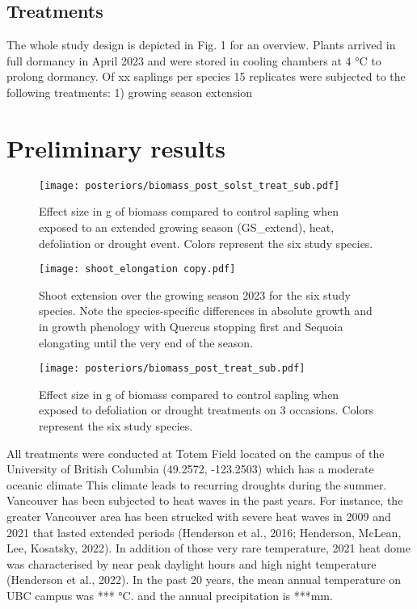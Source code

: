 \documentclass{article}
\begin{document}
	\subsection*{Treatments}
	The whole study design is depicted in Fig. 1 for an overview. Plants arrived in full dormancy in April 2023 and were stored in cooling chambers at 4 °C to prolong dormancy. Of xx saplings per species 15 replicates were subjected to the following treatments: 1) growing season extension 
	
	
	\section*{Preliminary results}
	
	
	\begin{figure}
	\centering
	\texttt{[image: posteriors/biomass\_post\_solst\_treat\_sub.pdf]} 
	\caption{Effect size in g of biomass compared to control sapling when exposed to an extended growing season (GS\_extend), heat, defoliation or drought event. Colors represent the six study species. }
	\label{fig:fig_1xxx}
\end{figure}
	
	
			\begin{figure}
		\centering
		\texttt{[image: shoot\_elongation copy.pdf]} 
		\caption{Shoot extension over the growing season 2023 for the six study species. Note the species-specific differences in absolute growth and in growth phenology with Quercus stopping first and Sequoia elongating until the very end of the season.}
		\label{fig:fig_1xxx}
	\end{figure}
	
	
				\begin{figure}
		\centering
		\texttt{[image: posteriors/biomass\_post\_treat\_sub.pdf]} 
		\caption{Effect size in g of biomass compared to control sapling when exposed to defoliation or drought treatments on 3 occasions. Colors represent the six study species.}
		\label{fig:fig_1xxx}
	\end{figure}
	
	
	
	All treatments were conducted at Totem Field located on the campus of the University of British Columbia (49.2572, -123.2503) which has a moderate oceanic climate This climate leads to recurring droughts during the summer. Vancouver has been subjected to heat waves in the past years. For instance, the greater Vancouver area has been strucked with severe heat waves in 2009 and 2021 that lasted extended periods (Henderson et al., 2016; Henderson, McLean, Lee, Kosatsky, 2022). In addition of those very rare temperature, 2021 heat dome was characterised by near peak daylight hours and high night temperature (Henderson et al., 2022). In the past 20 years, the mean annual temperature on UBC campus was *** °C. and the annual precipitation is ***mm.
\end{document}
